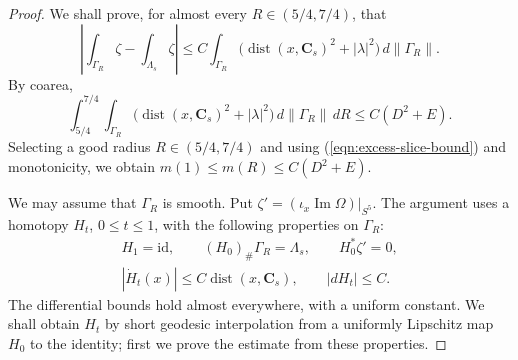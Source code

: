 \documentclass[11pt,a4paper]{article}
\numberwithin{equation}{section}
\theoremstyle{definition}
\theoremstyle{remark}
\newcommand{\dist}{\operatorname{dist}}
\newcommand{\dd}{\,d}
\begin{document}
	\begin{proof}
		We shall prove, for almost every $R\in(5/4,7/4)$, that
		\begin{equation}\label{eqn:excess-slice-bound}
			\left|\int_{\Gamma_R}\zeta-\int_{\Lambda_s}\zeta\right|
			\le C\int_{\Gamma_R}
			\bigl(\dist(x,\mathbf C_s)^2+|\lambda|^2\bigr)\dd\|\Gamma_R\|.
		\end{equation}
		By coarea,
		\[
		\int_{5/4}^{7/4}\int_{\Gamma_R}
		\bigl(\dist(x,\mathbf C_s)^2+|\lambda|^2\bigr)
		\dd\|\Gamma_R\|\,dR\le C(D^2+E).
		\]
		Selecting a good radius $R\in(5/4,7/4)$ and using
		(\ref{eqn:excess-slice-bound}) and monotonicity, we obtain
		$m(1)\le m(R)\le C(D^2+E)$.
		
		We may assume that $\Gamma_R$ is smooth. Put
		$\zeta'=(\iota_x\operatorname{Im}\Omega)|_{S^5}$. The argument uses
		a homotopy $H_t$, $0\le t\le1$, with the following properties on
		$\Gamma_R$:
		\[
		\begin{gathered}
			H_1=\mathrm{id},\qquad (H_0)_\#\Gamma_R=\Lambda_s,\qquad
			H_0^*\zeta'=0,\\
			|\dot H_t(x)|\le C\dist(x,\mathbf C_s),\qquad |dH_t|\le C.
		\end{gathered}
		\]
		The differential bounds hold almost everywhere, with a uniform constant.
		We shall obtain $H_t$ by short geodesic interpolation from a uniformly
		Lipschitz map $H_0$ to the identity; first we prove the estimate from
		these properties.
		

\end{proof}
\end{document}
